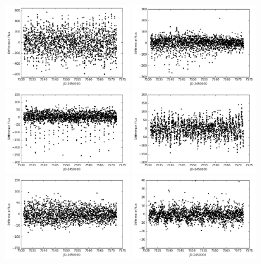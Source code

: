 \documentclass[12pt, preprint]{aastex}
\begin{document}
\begin{figure}[p]
\begin{center}
\includegraphics[width=0.48\textwidth]{f6a}
\includegraphics[width=0.48\textwidth]{f6b}
\includegraphics[width=0.48\textwidth]{f6c}
\includegraphics[width=0.48\textwidth]{f6d}
\includegraphics[width=0.48\textwidth]{f6e}
\includegraphics[width=0.48\textwidth]{f6f}

\end{center}
\end{figure}
\end{document}
